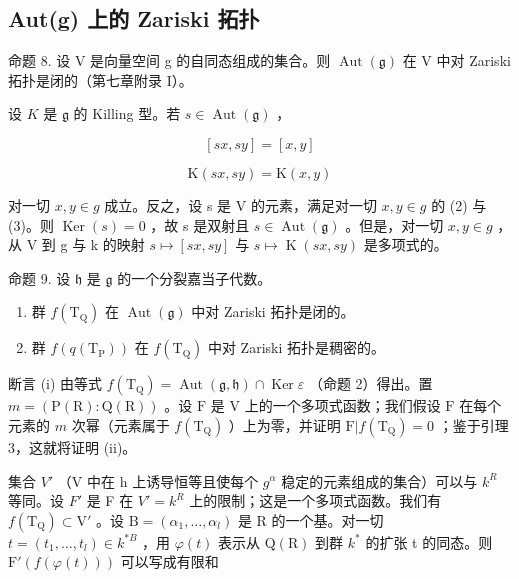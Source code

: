 \subsection{Aut(g) 上的 Zariski 拓扑}

命题 8. 设 V 是向量空间 g 的自同态组成的集合。则 \(\operatorname{Aut}(\mathfrak{g})\) 在 V 中对 Zariski 拓扑是闭的（第七章附录 I）。

设 \(K\) 是 \(\mathfrak{g}\) 的 Killing 型。若 \(s \in \operatorname{Aut}(\mathfrak{g})\) ，

\[
  [ s x, s y ] = [ x, y ]\tag{2}
\]

\[
\mathrm{K} (s x, s y) = \mathrm{K} (x, y)\tag{3}
\]

对一切 \(x, y \in g\) 成立。反之，设 s 是 V 的元素，满足对一切 \(x, y \in g\) 的 (2) 与 (3)。则 \(\operatorname{Ker}(s) = 0\) ，故 s 是双射且 \(s \in \operatorname{Aut}(\mathfrak{g})\) 。但是，对一切 \(x, y \in g\) ，从 V 到 g 与 k 的映射 \(s \mapsto [sx, sy]\) 与 \(s \mapsto \operatorname{K}(sx, sy)\) 是多项式的。

命题 9. 设 \(\mathfrak{h}\) 是 \(\mathfrak{g}\) 的一个分裂嘉当子代数。

\begin{enumerate}
\def\labelenumi{(\roman{enumi})}
\item
  群 \(f(\mathrm{T}_{\mathrm{Q}})\) 在 \(\operatorname{Aut}(\mathfrak{g})\) 中对 Zariski 拓扑是闭的。
\item
  群 \(f(q(\mathrm{T_P}))\) 在 \(f(\mathrm{T_Q})\) 中对 Zariski 拓扑是稠密的。
\end{enumerate}

断言 (i) 由等式 \(f(\mathrm{T}_{\mathrm{Q}}) = \operatorname{Aut}(\mathfrak{g},\mathfrak{h})\cap \operatorname{Ker}\varepsilon\) （命题 2）得出。置 \(m = (\mathrm{P}(\mathrm{R}):\mathrm{Q}(\mathrm{R}))\) 。设 \(\mathrm{F}\) 是 \(\mathrm{V}\) 上的一个多项式函数；我们假设 \(\mathrm{F}\) 在每个元素的 \(m\) 次幂（元素属于 \(f(\mathrm{T}_{\mathrm{Q}})\) ）上为零，并证明 \(\mathrm{F}|f(\mathrm{T}_{\mathrm{Q}}) = 0\) ；鉴于引理 3，这就将证明 (ii)。

集合 \(V'\) （V 中在 h 上诱导恒等且使每个 \(g^{\alpha}\) 稳定的元素组成的集合）可以与 \(k^{R}\) 等同。设 \(F'\) 是 F 在 \(V' = k^{R}\) 上的限制；这是一个多项式函数。我们有 \(f(\mathrm{T}_{\mathrm{Q}}) \subset \mathrm{V}'\) 。设 \(\mathrm{B} = (\alpha_{1}, \ldots, \alpha_{l})\) 是 R 的一个基。对一切 \(t = (t_{1}, \ldots, t_{l}) \in k^{*B}\) ，用 \(\varphi(t)\) 表示从 \(\mathrm{Q}(\mathrm{R})\) 到群 \(k^{*}\) 的扩张 t 的同态。则 \(\mathrm{F}'(f(\varphi(t)))\) 可以写成有限和

